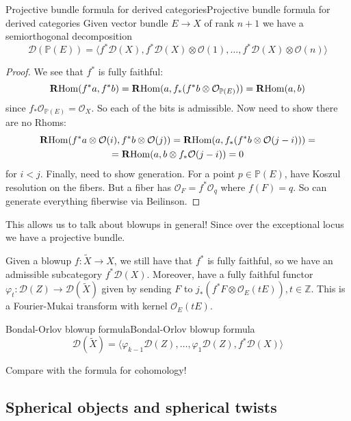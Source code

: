 \begin{proposition}{Projective bundle formula for derived categories}{Projective bundle formula for derived categories}
    Given vector bundle $E\rightarrow X$ of rank $n+1$ we have a semiorthogonal decomposition $$\mathcal{D}(\mathbb{P}(E))=\langle f^*\mathcal{D}(X), f^*\mathcal{D}(X)\otimes \mathcal{O}(1),\dots, f^*\mathcal{D}(X)\otimes \mathcal{O}(n)\rangle$$
\end{proposition}

\begin{proof}
    We see that $f^*$ is fully faithful: $$\operatorname{\mathbf{R}Hom}(f^*a,f^*b)=\operatorname{\mathbf{R}Hom}(a, f_{*} (f^*b\otimes \mathcal{O}_{\mathbb{P}(E)}))=\operatorname{\mathbf{R}Hom}(a, b)$$since $f_*\mathcal{O}_{\mathbb{P}(E)}=\mathcal{O}_{X}$. So each of the bits is admissible. Now need to show there are no Rhoms: $$\begin{gathered}
\operatorname{\mathbf{R}Hom}(f^*a\otimes \mathcal{O}(i), f^*b\otimes \mathcal{O}(j))=\operatorname{\mathbf{R}Hom}(a, f_{*}(f^*b\otimes \mathcal{O}(j-i)))=\\
=\operatorname{\mathbf{R}Hom}(a, b\otimes f_{*}\mathcal{O}(j-i))=0
\end{gathered}$$for $i<j$. Finally, need to show generation. For a point $p\in \mathbb{P}(E)$, have Koszul resolution on the fibers. But a fiber has $\mathcal{O}_{F}=f^*\mathcal{O}_{q}$ where $f(F)=q$. So can generate everything fiberwise via Beilinson.  
\end{proof}

This allows us to talk about blowups in general! Since over the exceptional locus we have a projective bundle. 

Given a blowup $f:\tilde{X}\xrightarrow{}X$, we still have that $f^*$ is fully faithful, so we have an admissible subcategory $f^*\mathcal{D}(X)$. Moreover, have a fully faithful functor $\varphi_{t}:\mathcal{D}(Z)\xrightarrow{}\mathcal{D}(\tilde{X})$ given by sending $F$ to $j_{*}(f^*F\otimes \mathcal{O}_{E}(tE)), t\in \mathbb{Z}$. This is a Fourier-Mukai transform with kernel $\mathcal{O}_{E}(tE)$.


\begin{theorem}{Bondal-Orlov blowup formula}{Bondal-Orlov blowup formula}
    $$\mathcal{D}(\tilde{X})=\langle \varphi_{{k-1}}\mathcal{D}(Z),\dots,\varphi_{1}\mathcal{D}(Z), f^*\mathcal{D}(X)\rangle$$
\end{theorem}

Compare with the formula for cohomology!

\subsection{Spherical objects and spherical twists}

